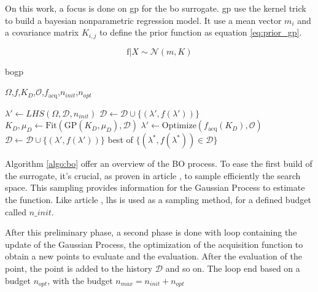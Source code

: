 On this work, a focus is done on \acrshort{gp} for the \acrshort{bo} surrogate. \acrshort{gp} use the kernel trick to build a bayesian nonparametric regression model. It use a mean vector $m_i$ and a covariance matrix $K_{i,j}$ to define the prior function as equation \ref{eq:prior_gp}. 

\begin{equation}
    \text{f} | X \sim  \mathcal N (m,K)
    \label{eq:prior_gp}
\end{equation}

\begin{algorithm}[h]
\caption{\acrshort{bogp}}
\label{algo:bo}
\begin{algorithmic}[1]
\Require 
    $\Omega$,$f$,$K_D$,$\mathcal{O}$,$f_{\text{acq}}$,$n_{init} $,$n_{opt}$
        
 
    \State $\lambda' \gets LHS(\Omega,\mathcal{D},n_{init})$ 
    \State $\mathcal{D} \gets \mathcal{D} \cup \{(\lambda', f(\lambda'))\}$ 
\EndFor 
{} 
    \State $K_D,\mu_D \gets \text{Fit}(\text{GP}(K_D,\mu_D), \mathcal{D})$ 
    \State $\lambda' \gets \text{Optimize}(f_{\text{acq}}(K_D), \mathcal{O})$ 
    \State $\mathcal{D} \gets \mathcal{D} \cup \{(\lambda', f(\lambda'))\}$ 
\EndFor
\State \Return best of $\{(\lambda^*, f(\lambda^*)) \in \mathcal{D}\}$
\end{algorithmic}
\end{algorithm}

Algorithm \ref{algo:bo} offer an overview of the BO process. To ease the first build of the surrogate, it's crucial, as proven in article \cite{wilson_efficiently_2020}, to sample efficiently the search space. This sampling provides information for the Gaussian Process to estimate the function. Like article \cite{borisut_adaptive_2023}, \acrfull{lhs} is used as a sampling method, for a defined budget called $n\_init$. 

After this preliminary phase, a second phase is done with loop containing the update of the Gaussian Process, the optimization of the acquisition function to obtain a new points to evaluate and the evaluation. After the evaluation of the point, the point is added to the history $\mathcal D$ and so on. The loop end based on a budget $n_{opt}$, with the budget $n_{max}=n_{init}+n_{opt}$ 

